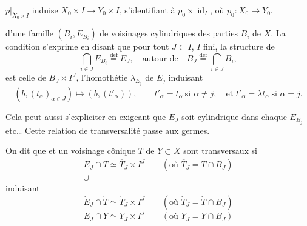 $p|_{\dot X_0\times I}$ induise $\dot X_0\times I\longrightarrow Y_0\times I$,
s'identifiant à $p_0\times\operatorname{id}_I$, où $p_0:X_0\longrightarrow Y_0$.

 d'une famille 
$(B_i,E_{B_i})$ de voisinages cylindriques des parties $B_i$ de $X$.
La condition s'exprime en disant que pour
tout $J\subset I$, $I$ fini, la structure de
\[
\bigcap_{i\in J}E_{B_i}\overset{\mathrm{def}}=E_J,
\quad\text{autour de}\quad
B_J\overset{\mathrm{def}}=\bigcap_{i\in J}B_i,
\]
est celle de $B_J\times I^J$, l'homothétie
$\lambda_{E_j}$ de $E_j$  induisant
\[
(b,(t_\alpha)_{\alpha\in J})\longmapsto(b,(t'_\alpha)),
\qquad
t'_\alpha=t_\alpha\ \text{si }\alpha\ne j,\quad
\text{et }t'_\alpha=\lambda t_\alpha\ \text{si }\alpha=j.
\]

Cela peut aussi s'expliciter en exigeant
que $E_J$ soit cylindrique dans chaque $E_{B_j}$ etc\ldots
Cette relation de transversalité passe aux germes.

On dit que  \uline{et}
un voisinage cônique $T$ de $Y\subset X$ sont
transversaux 
si 
\[
\begin{array}{l}
E_J\cap T\simeq\overline T_J\times I^J
\qquad(\text{où }\overline T_J=T\cap B_J)\\
\cup
\end{array}
\]
induisant
\[
\dot E_J\cap\dot T\simeq\dot T_J\times I^J
\qquad(\text{où }\dot T_J=\dot T\cap B_J)
\]
\[
E_J\cap Y\simeq Y_J\times I^J
\qquad(\text{où }Y_J=Y\cap B_J)
\]
